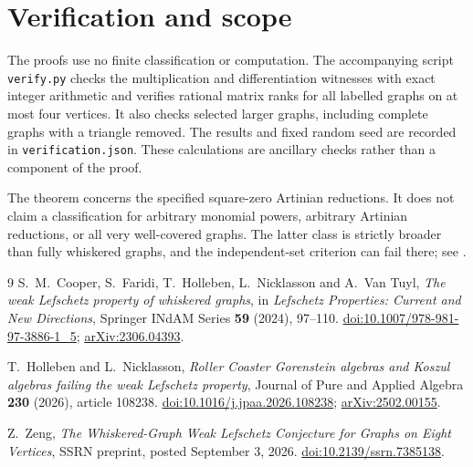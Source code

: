 \documentclass[11pt]{article}
\theoremstyle{remark}
\begin{document}
\section{Verification and scope}
The proofs use no finite classification or computation. The accompanying script \texttt{verify.py} checks the multiplication and differentiation witnesses with exact integer arithmetic and verifies rational matrix ranks for all labelled graphs on at most four vertices. It also checks selected larger graphs, including complete graphs with a triangle removed. The results and fixed random seed are recorded in \texttt{verification.json}. These calculations are ancillary checks rather than a component of the proof.

The theorem concerns the specified square-zero Artinian reductions. It does not claim a classification for arbitrary monomial powers, arbitrary Artinian reductions, or all very well-covered graphs. The latter class is strictly broader than fully whiskered graphs, and the independent-set criterion can fail there; see \cite[Example 3.18]{HN}.

\begin{thebibliography}{9}
S.~M.~Cooper, S.~Faridi, T.~Holleben, L.~Nicklasson and A.~Van Tuyl,
\emph{The weak Lefschetz property of whiskered graphs},
in \emph{Lefschetz Properties: Current and New Directions}, Springer INdAM Series \textbf{59} (2024), 97--110.
\href{https://doi.org/10.1007/978-981-97-3886-1_5}{doi:10.1007/978-981-97-3886-1\_5};
\href{https://arxiv.org/abs/2306.04393}{arXiv:2306.04393}.

T.~Holleben and L.~Nicklasson,
\emph{Roller Coaster Gorenstein algebras and Koszul algebras failing the weak Lefschetz property},
Journal of Pure and Applied Algebra \textbf{230} (2026), article 108238.
\href{https://doi.org/10.1016/j.jpaa.2026.108238}{doi:10.1016/j.jpaa.2026.108238};
\href{https://arxiv.org/abs/2502.00155}{arXiv:2502.00155}.

Z.~Zeng,
\emph{The Whiskered-Graph Weak Lefschetz Conjecture for Graphs on Eight Vertices},
SSRN preprint, posted September 3, 2026.
\href{https://doi.org/10.2139/ssrn.7385138}{doi:10.2139/ssrn.7385138}.
\end{thebibliography}
\end{document}
